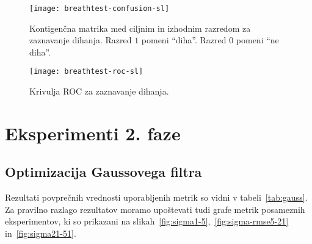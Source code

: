 \begin{figure}[!htbp]
	\centering
	\texttt{[image: breathtest-confusion-sl]}
	\caption[Kontigenčna matrika za zaznavanje dihanja]{Kontigenčna matrika med ciljnim in izhodnim razredom za zaznavanje dihanja. Razred $1$ pomeni ``diha''. Razred $0$ pomeni ``ne diha''.}
	\label{fig:breathtest-confusion}
\end{figure}

\begin{figure}[!htbp]
	\centering
	\texttt{[image: breathtest-roc-sl]}
	\caption[Krivulja ROC za zaznavanje dihanja]{Krivulja ROC za zaznavanje dihanja.}
	\label{fig:breathtest-roc}
\end{figure}




























\section{Eksperimenti 2. faze}


\subsection{Optimizacija Gaussovega filtra}
Rezultati povprečnih vrednosti uporabljenih metrik so vidni v tabeli~\ref{tab:gauss}. Za pravilno razlago rezultatov moramo upoštevati tudi grafe metrik posameznih eksperimentov, ki so prikazani na slikah~\ref{fig:sigma1-5},~\ref{fig:sigma-rmse5-21} in~\ref{fig:sigma21-51}. 



